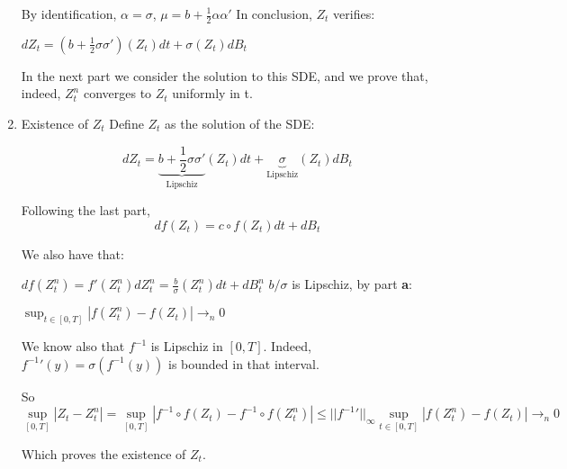 \documentclass[11pt]{article}
\begin{document}
\begin{enumerate}
By identification, \(\alpha = \sigma\), \(\mu = b + \frac12 \alpha \alpha'\)
In conclusion, \(Z_t\) verifies:

\(dZ_t = (b+\frac12\sigma\sigma')(Z_t) dt + \sigma(Z_t) dB_t\)

In the next part we consider the solution to this SDE, and we prove that, indeed, \(Z_t^n\) converges to \(Z_t\) uniformly in t.

\item Existence of \(Z_t\)
\label{sec:orgheadline4}
Define \(Z_t\) as the solution of the SDE:

\[dZ_t = \underbrace{b+\frac12\sigma\sigma'}_{\text{Lipschiz}}(Z_t) dt + \underbrace{\sigma}_{\text{Lipschiz}}(Z_t) dB_t\]

Following the last part,
\[ df(Z_t) = c\circ f(Z_t) dt + dB_t \]

We also have that:

\(df(Z_t^n) = f'(Z_t^n) dZ_t^n = \frac{b}{\sigma}(Z_t^n) dt + dB^n_t\)
\(b/\sigma\) is Lipschiz, by part \textbf{a}:

\(\sup_{t \in [0, T]} |f(Z_t^n) - f(Z_t)| \rightarrow_n 0\)

We know also that \(f^{-1}\) is Lipschiz in \([0, T]\). Indeed, \({f^{-1}}'(y) = \sigma(f^{-1}(y))\) is bounded in that interval.

So
\[\sup_{[0, T]} |Z_t- Z^n_t| = \sup_{[0, T]}|f^{-1}\circ f(Z_t) - f^{-1}\circ f(Z^n_t)| \le ||{f^{-1}}'||_{\infty} \sup_{t \in [0, T]} |f(Z_t^n) - f(Z_t)| \rightarrow_n 0\]

Which proves the existence of \(Z_t\).
\end{enumerate}
\end{document}
